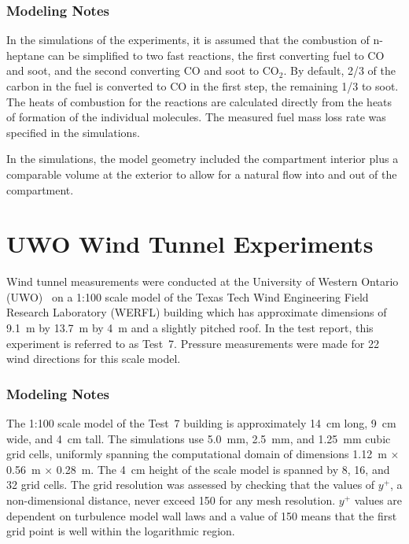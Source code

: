 \subsubsection{Modeling Notes}

In the simulations of the experiments, it is assumed that the combustion of n-heptane can be simplified to two fast reactions, the first converting fuel to CO and soot, and the second converting CO and soot to CO$_2$. By default, 2/3 of the carbon in the fuel is converted to CO in the first step, the remaining 1/3 to soot. The heats of combustion for the reactions are calculated directly from the heats of formation of the individual molecules. The measured fuel mass loss rate was specified in the simulations.

In the simulations, the model geometry included the compartment interior plus a comparable volume at the exterior to allow for a natural flow into and out of the compartment.



\section{UWO Wind Tunnel Experiments}
\label{UWO_Wind_Tunnel_Description}

Wind tunnel measurements were conducted at the University of Western Ontario (UWO)~\cite{UWO_Wind_Tunnel_Report} on a 1:100 scale model of the Texas Tech Wind Engineering Field Research Laboratory (WERFL) building which has approximate dimensions of 9.1~m by 13.7~m by 4~m and a slightly pitched roof. In the test report, this experiment is referred to as Test~7. Pressure measurements were made for 22 wind directions for this scale model.

\subsubsection{Modeling Notes}

The 1:100 scale model of the Test~7 building is approximately 14~cm long, 9~cm wide, and 4~cm tall. The simulations use 5.0~mm, 2.5~mm, and 1.25~mm cubic grid cells, uniformly spanning the computational domain of dimensions 1.12~m $\times$ 0.56~m $\times$ 0.28~m. The 4~cm height of the scale model is spanned by 8, 16, and 32 grid cells. The grid resolution was assessed by checking that the values of $y^+$, a non-dimensional distance, never exceed 150 for any mesh resolution. $y^+$ values are dependent on turbulence model wall laws and a value of 150 means that the first grid point is well within the logarithmic region.

